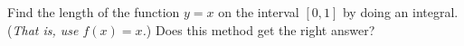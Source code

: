 Find the length of the function $y=x$ on the interval $[0,1]$ by doing an integral.  (\emph{That is, use $f(x)=x$.})  Does this method get the right answer?

